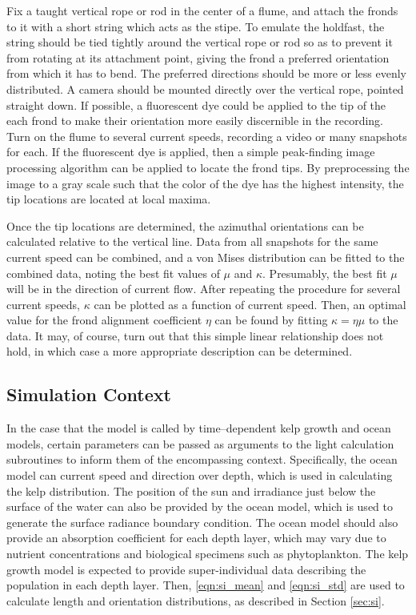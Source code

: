 \documentclass[ms,cpyr,lof,lot]{uathesis}
\providecommand{\DIFadd}[1]{{\protect\color{blue}\uwave{#1}}} %
\providecommand{\DIFaddbegin}{} %
\providecommand{\DIFaddend}{} %
\newcommand{\DIFaddincludegraphics}[2][]{{\color{blue}\fbox{\DIFOincludegraphics[#1]{#2}}}} %
\DeclareRobustCommand{\DIFaddbegin}{\DIFOaddbegin \let\includegraphics\DIFaddincludegraphics} %
\DeclareRobustCommand{\DIFaddend}{\DIFOaddend \let\includegraphics\DIFOincludegraphics} %
\begin{document}
Fix a taught vertical rope or rod in the center of a flume, and attach the fronds to it with a short string which acts as the stipe.
To emulate the holdfast, the string should be tied tightly around the vertical rope or rod so as to prevent it from rotating at its attachment point,
giving the frond a preferred orientation from which it has to bend.
The preferred directions should be more or less evenly distributed.
A camera should be mounted directly over the vertical rope, pointed straight down.
If possible, a fluorescent dye could be applied to the tip of the each frond to make their orientation more easily discernible in the recording.
Turn on the flume to several current speeds, recording a video or many snapshots for each.
If the fluorescent dye is applied, then a simple peak-finding image processing algorithm can be applied to locate the frond tips.
By preprocessing the image to a gray scale such that the color of the dye has the highest intensity,
the tip locations are located at local maxima.

Once the tip locations are determined, the azimuthal orientations can be calculated relative to the vertical line.
Data from all snapshots for the same current speed can be combined, and a von Mises distribution can be fitted to the combined data,
noting the best fit values of $\mu$ and $\kappa$.
Presumably, the best fit $\mu$ will be in the direction of current flow.
After repeating the procedure for several current speeds, $\kappa$ can be plotted as a function of current speed.
Then, an optimal value for the frond alignment coefficient $\eta$ can be found by fitting $\kappa = \eta\mu$ to the data.
It may, of course, turn out that this simple linear relationship does not hold, in which case a more appropriate description can be determined.

\subsection{Simulation Context}
\label{sec:simulation_context}
In the case that the model is called by time--dependent kelp growth and ocean models, certain parameters can be passed as arguments to the light calculation subroutines to inform them of the encompassing context.
Specifically, the ocean model can \DIFaddbegin \DIFadd{provide }\DIFaddend current speed and direction over depth, which is used in calculating the kelp distribution.
The position of the sun and irradiance just below the surface of the water can also be provided by the ocean model, which is used to generate the surface radiance boundary condition.
The ocean model should also provide an absorption coefficient for each depth layer, which may vary due to nutrient concentrations and biological specimens such as phytoplankton.
The kelp growth model is expected to provide super-individual data describing the population in each depth layer.
Then, \eqref{eqn:si_mean} and \eqref{eqn:si_std} are used to calculate length and orientation distributions, as described in Section \ref{sec:si}.
\end{document}
